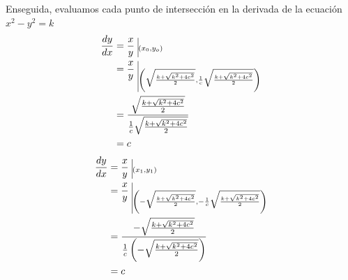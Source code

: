 \documentclass[12pt]{article}
\begin{document}
Enseguida, evaluamos cada punto de intersección en la derivada de la ecuación $x^2-y^2=k$
\begin{equation*}
  \begin{split}
    \frac{dy}{dx}
    &= \frac{x}{y} ~ \vline _{(x_0,y_o)}\\
    &= \frac{x}{y} ~ \vline _{\left(\sqrt{\frac{k+\sqrt{k^2+4c^2}}{2}}, \frac{1}{c}\sqrt{\frac{k+\sqrt{k^2+4c^2}}{2}}\right)}\\
    &= \frac{\sqrt{\frac{k+\sqrt{k^2+4c^2}}{2}}}{\frac{1}{c}\sqrt{\frac{k+\sqrt{k^2+4c^2}}{2}}}\\
    &= c\\
  \end{split}
\end{equation*}
\begin{equation*}
  \begin{split}
    \frac{dy}{dx}
    &= \frac{x}{y} ~ \vline _{(x_1,y_1)}\\
    &= \frac{x}{y} ~ \vline _{\left(-\sqrt{\frac{k+\sqrt{k^2+4c^2}}{2}}, -\frac{1}{c}\sqrt{\frac{k+\sqrt{k^2+4c^2}}{2}}\right)}\\
    &= \frac{-\sqrt{\frac{k+\sqrt{k^2+4c^2}}{2}}}{\frac{1}{c}\left(-\sqrt{\frac{k+\sqrt{k^2+4c^2}}{2}}\right)}\\
    &= c\\
  \end{split}
\end{equation*}
\end{document}
